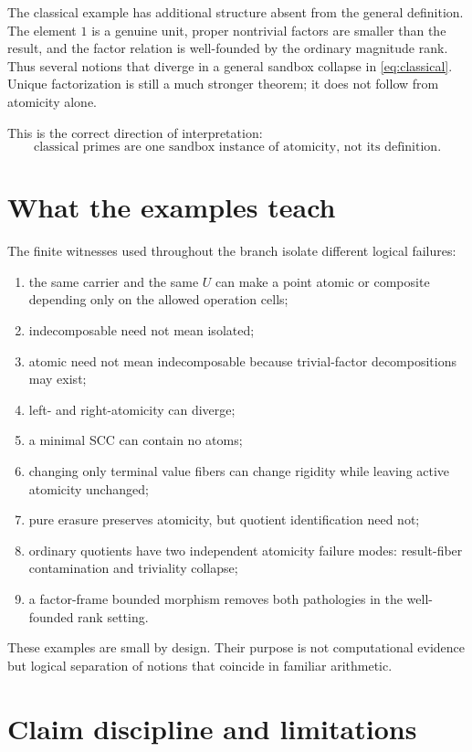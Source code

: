 \documentclass[11pt]{article}
\theoremstyle{definition}
\theoremstyle{remark}
\begin{document}
The classical example has additional structure absent from the general definition. The element \(1\) is a genuine unit, proper nontrivial factors are smaller than the result, and the factor relation is well-founded by the ordinary magnitude rank. Thus several notions that diverge in a general sandbox collapse in \eqref{eq:classical}. Unique factorization is still a much stronger theorem; it does not follow from atomicity alone.

This is the correct direction of interpretation:
\[
\boxed{\text{classical primes are one sandbox instance of atomicity, not its definition}.}
\]

\section{What the examples teach}

The finite witnesses used throughout the branch isolate different logical failures:
\begin{enumerate}[leftmargin=2em]
\item the same carrier and the same \(U\) can make a point atomic or composite depending only on the allowed operation cells;
\item indecomposable need not mean isolated;
\item atomic need not mean indecomposable because trivial-factor decompositions may exist;
\item left- and right-atomicity can diverge;
\item a minimal SCC can contain no atoms;
\item changing only terminal value fibers can change rigidity while leaving active atomicity unchanged;
\item pure erasure preserves atomicity, but quotient identification need not;
\item ordinary quotients have two independent atomicity failure modes: result-fiber contamination and triviality collapse;
\item a factor-frame bounded morphism removes both pathologies in the well-founded rank setting.
\end{enumerate}

These examples are small by design. Their purpose is not computational evidence but logical separation of notions that coincide in familiar arithmetic.

\section{Claim discipline and limitations}
\end{document}
